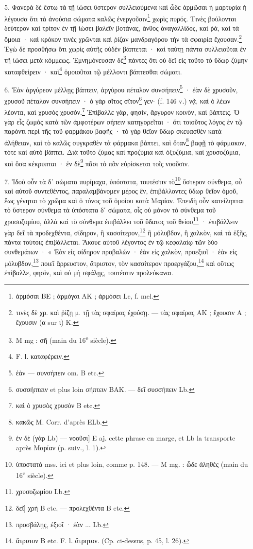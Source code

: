\documentclass[a4paper, 11pt, oneside, polutonikogreek, french]{article}
\begin{document}
5. Φανερὰ δὲ ἔστω τὰ τῇ ἰώσει ὕστερον συλλειούμενα καὶ ὧδε ἁρμῶσαι ἡ μαρτυρία ἡ λέγουσα ὅτι τὰ ἀνούσια σώματα καλῶς ἐνεργοῦσιν\footnote{ἁρμόσαι BE ; ἁρμόγαι AK ; ἁρμόσει Lc, f. mel.} χωρὶς πυρός. Τινὲς βούλονται δεύτερον καὶ τρίτον ἐν τῇ ἱώσει βαλεῖν βοτάνας, ἄνθος ἀναγαλλίδος, καὶ ῥὰ, καὶ τὰ ὅμοια · καὶ κρόκον τινὲς χρῶνται καὶ ῥίζαν μανδραγόρου τὴν τὰ σφαιρία ἔχουσαν.\footnote{τινὲς δὲ χρ. καὶ ῥίζῃ μ. τῇ τὰς σφαίρας ἐχούσῃ. --- τὰς σφαίρας AK ; ἔχουσιν A ; ἔχουσιν (α sur ι) K.} Ἐγὼ δὲ προσθήσω ὅτι χωρὶς αὐτῆς οὐδὲν βάπτεται · καὶ ταύτῃ πάντα συλλειοῦται ἐν τῇ ἰώσει μετὰ κόμμεως. Ἐμνημόνευσαν δὲ\footnote{M mg : σῆ (main du 16\textsuperscript{e} siècle).} πάντες ὅτι οὐ δεῖ εἰς τοῦτο τὸ ὕδωρ ζύμην καταφθείρειν · καὶ\footnote{F. l. καταφέρειν.} ὁμοιοῦται τῷ μέλλοντι βάπτεσθαι σώματι.

6. Ἐὰν ἀργύρεον μέλλῃς βάπτειν, ἀργύρου πέταλον συνσήπειν\footnote{ἐὰν --- συνσήπειν om. B etc.} · ἐὰν δὲ χρυσοῦν, χρυσοῦ πέταλον συνσήπειν · ὁ γὰρ σῖτος σῖτον\footnote{συσσήπτειν et plus loin σήπτειν BAK. --- δεῖ συσσήπειν Lb.} γεν- (f. 146 v.) νᾷ, καὶ ὁ λέων λέοντα, καὶ χρυσὸς χρυσόν.\footnote{καὶ ὁ χρυσὸς χρυσὸν B etc.} Ἐπίβαλλε γὰρ, φησὶν, ἄργυρον κοινὸν, καὶ βάπτεις. Ὁ γὰρ εἷς ζωμὸς κατὰ τῶν ἀμφοτέρων σήπειν κατηγορεῖται · ὅτι τοιοῦτος λόγος ἐν τῷ παρόντι περὶ τῆς τοῦ φαρμάκου βαφῆς · τὸ γὰρ θεῖον ὕδωρ σκευασθὲν κατὰ ἀλήθειαν, καὶ τὸ καλῶς συγκραθὲν τὰ φάρμακα βάπτει, καὶ ὅταν\footnote{κακῶς M. Corr. d'après ELb.} βαφῇ τὸ φάρμακον, τότε καὶ αὐτὸ βάπτει. Διὰ τοῦτο ζύμας καὶ προζύμια καὶ ὀξυζύμια, καὶ χρυσοζύμια, καὶ ὅσα κέκρυπται · ἐν δὲ\footnote{ἐν δὲ (γὰρ Lb) --- νοοῦσι] E aj. cette phrase en marge, et Lb la transporte après Mαρίαν (p. suiv., l. 1).} πᾶσι τὸ πᾶν εὑρίσκεται τοῖς νοοῦσιν.

7. Ἰδοὺ οὖν τὰ δʹ σώματα πυρίμαχα, ὑπόστατα, τουτέστιν τὸ\footnote{ὑποστατὰ mss. ici et plus loin, comme p. 148. --- M mg. : ὧδε ἀληθὲς (main du 16\textsuperscript{e} siècle).} ὕστερον σύνθεμα, οὗ καὶ αὐτοῦ συντεθέντος, παραλαμβάνομεν μέρος ἓν, ἐπιβάλλοντες ὕδωρ θεῖον ὁμοῦ, ἕως γένηται τὸ χρῶμα καὶ ὁ τόνος τοῦ ὁμοίου κατὰ Μαρίαν. Ἐπειδὴ οὖν κατείληπται τὸ ὕστερον σύνθεμα τὰ ὑπόστατα δʹ σώματα, οἷς οὐ μόνον τὸ σύνθεμα τοῦ χρυσοζυμίου, ἀλλὰ καὶ τὸ σύνθεμα ἐπιβάλλει τοῦ ὕδατος τοῦ θείου\footnote{χρυσοζωμίου Lb.} · ἐπιβάλλειν γὰρ δεῖ τὰ προδεχθέντα, σίδηρον, ἢ κασσίτερον,\footnote{δεῖ] χρὴ B etc. --- προλεχθέντα B etc.} ἢ μόλυβδον, ἢ χαλκὸν, καὶ τὰ ἑξῆς, πάντα τούτοις ἐπιβάλλεται. Ἄκουε αὐτοῦ λέγοντος ἐν τῷ κεφαλαίῳ τῶν δύο συνθεμάτων · « Ἐὰν εἰς σίδηρον προβαλών · ἐὰν εἰς χαλκὸν, προεξιοῖ · ἐὰν εἰς μόλυβδον,\footnote{προσβάλῃς, ἐξιοῖ · ἐὰν ... Lb.} ποιεῖ ἄρρευστον, ἄτριστον, τὸν κασσίτερον προεργάζου,\footnote{ἄτρυτον B etc. F. l. ἄτρητον. (Cp. ci-dessus, p. 45, l. 26).} καὶ οὕτως ἐπίβαλλε, φησὶν, καὶ οὐ μὴ σφάλῃς, τουτέστιν προλεύκαναι.
\end{document}
